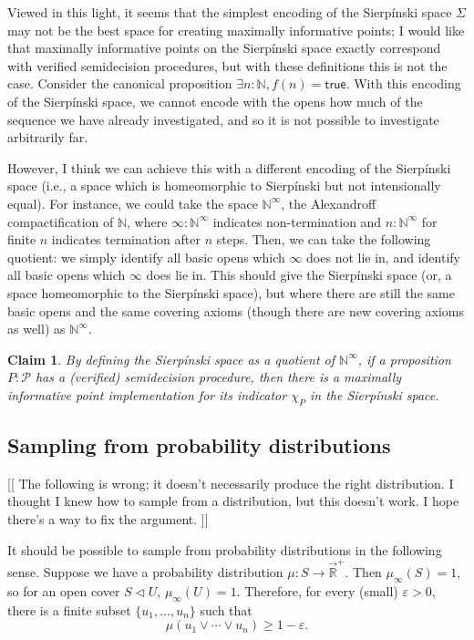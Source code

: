 \documentclass{article}           %
\newtheorem{claim}{Claim}
\newcommand{\R}{\mathbb{R}}
\newcommand{\lowerT}[1]{\overrightarrow{#1}}
\newcommand{\cov}{\vartriangleleft}
\newcommand{\Prop}{\mathcal{P}}
\newcommand{\nat}{\mathbb{N}}
\begin{document}
Viewed in this light, it seems that the simplest encoding of the Sierpínski space $\Sigma$ may not be the best space for creating maximally informative points; I would like that maximally informative points on the Sierpínski space exactly correspond with verified semidecision procedures, but with these definitions this is not the case. Consider the canonical proposition $\exists n : \nat, f(n) = \mathsf{true}$. With this encoding of the Sierpínski space, we cannot encode with the opens how much of the sequence we have already investigated, and so it is not possible to investigate arbitrarily far.

However, I think we can achieve this with a different encoding of the Sierpínski space (i.e., a space which is homeomorphic to Sierpínski but not intensionally equal). For instance, we could take the space $\nat^\infty$, the Alexandroff compactification of $\nat$, where $\infty : \nat^\infty$ indicates non-termination and $n : \nat^\infty$ for finite $n$ indicates termination after $n$ steps. Then, we can take the following quotient: we simply identify all basic opens which $\infty$ does not lie in, and identify all basic opens which $\infty$ does lie in. This should give the Sierpínski space (or, a space homeomorphic to the Sierpínski space), but where there are still the same basic opens and the same covering axioms (though there are new covering axioms as well) as $\nat^\infty$.

\begin{claim}
By defining the Sierpínski space as a quotient of $\nat^\infty$, if a proposition $P : \Prop$ has a (verified) semidecision procedure, then there is a maximally informative point implementation for its indicator $\chi_P$ in the Sierpínski space.
\end{claim}


\subsection{Sampling from probability distributions}

[[ The following is wrong; it doesn't necessarily produce the right distribution. I thought I knew how to sample from a distribution, but this doesn't work. I hope there's a way to fix the argument. ]]

It should be possible to sample from probability distributions in the following sense. Suppose we have a probability distribution $\mu : S \to \lowerT{\R}^+$. Then $\mu_\infty(S) = 1$, so for an open cover $S \cov U$, $\mu_\infty(U) = 1$. Therefore, for every (small) $\varepsilon > 0$, there is a finite subset $\{u_1, \ldots, u_n \}$ such that
\[
\mu(u_1 \vee \cdots \vee u_n) \ge 1 - \varepsilon.
\]
\end{document}
